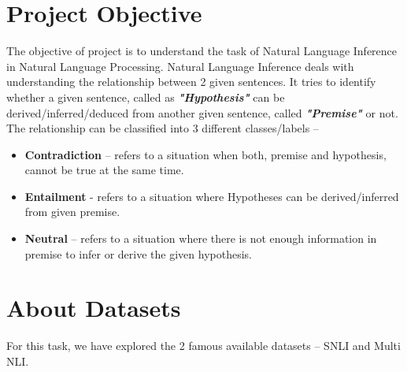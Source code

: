 

\section{Project Objective}

The objective of project is to understand the task of Natural Language Inference in Natural Language Processing.
Natural Language Inference deals with understanding the relationship between 2 given sentences. It tries to identify whether a given sentence, called as \textbf{\textit{"Hypothesis"}} can be derived/inferred/deduced from another given sentence, called \textbf{\textit{"Premise"}} or not. The relationship can be classified into 3 different classes/labels – \par
\begin{itemize}
	\item \textbf{Contradiction} – refers to a situation when both, premise and hypothesis, cannot be true at the same time.
	\item \textbf{Entailment} - refers to a situation where Hypotheses can be derived/inferred from given premise.
	\item \textbf{Neutral} – refers to a situation where there is not enough information in premise to infer or derive the given hypothesis.
\end{itemize}


\section{About Datasets}
For this task, we have explored the 2 famous available datasets – SNLI and Multi NLI.

